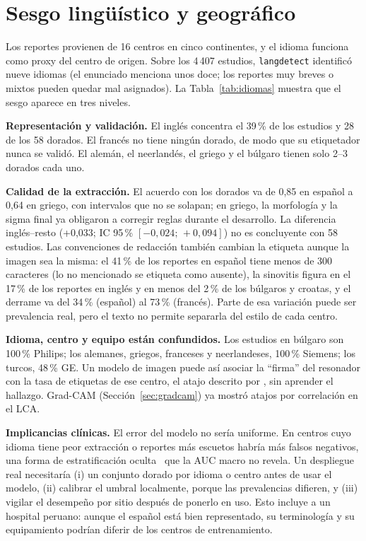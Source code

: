\section{Sesgo lingüístico y geográfico}
\label{sec:sesgo}

Los reportes provienen de 16 centros en cinco continentes, y el idioma funciona como proxy
del centro de origen. Sobre los 4\,407 estudios, \texttt{langdetect} identificó nueve
idiomas (el enunciado menciona unos doce; los reportes muy breves o mixtos pueden quedar mal
asignados). La Tabla~\ref{tab:idiomas} muestra que el sesgo aparece en tres niveles.

\textbf{Representación y validación.} El inglés concentra el 39\,\% de los estudios y 28 de
los 58 dorados. El francés no tiene ningún dorado, de modo que su etiquetador nunca se
validó. El alemán, el neerlandés, el griego y el búlgaro tienen solo 2--3 dorados cada uno.

\textbf{Calidad de la extracción.} El acuerdo con los dorados va de 0,85 en español a 0,64
en griego, con intervalos que no se solapan; en griego, la morfología y la sigma final ya
obligaron a corregir reglas durante el desarrollo. La diferencia inglés--resto
(+0,033; IC 95\,\% $[-0{,}024;\,+0{,}094]$) no es concluyente con 58 estudios. Las
convenciones de redacción también cambian la etiqueta aunque la imagen sea la misma: el
41\,\% de los reportes en español tiene menos de 300 caracteres (lo no mencionado se
etiqueta como ausente), la sinovitis figura en el 17\,\% de los reportes en inglés y en
menos del 2\,\% de los búlgaros y croatas, y el derrame va del 34\,\% (español) al 73\,\%
(francés). Parte de esa variación puede ser prevalencia real, pero el texto no permite
separarla del estilo de cada centro.

\textbf{Idioma, centro y equipo están confundidos.} Los estudios en búlgaro son 100\,\%
Philips; los alemanes, griegos, franceses y neerlandeses, 100\,\% Siemens; los turcos, 48\,\%
GE. Un modelo de imagen puede así asociar la ``firma'' del resonador con la tasa de
etiquetas de ese centro, el atajo descrito por \citet{zech2018variable}, sin aprender el
hallazgo. Grad-CAM (Sección~\ref{sec:gradcam}) ya mostró atajos por correlación en el LCA.

\textbf{Implicancias clínicas.} El error del modelo no sería uniforme. En centros cuyo
idioma tiene peor extracción o reportes más escuetos habría más falsos negativos, una forma
de estratificación oculta~\citep{oakden2020hidden} que la AUC macro no revela. Un
despliegue real necesitaría (i) un conjunto dorado por idioma o centro antes de usar el
modelo, (ii) calibrar el umbral localmente, porque las prevalencias difieren, y (iii) vigilar
el desempeño por sitio después de ponerlo en uso. Esto incluye a un hospital peruano: aunque
el español está bien representado, su terminología y su equipamiento podrían diferir de los
centros de entrenamiento.

